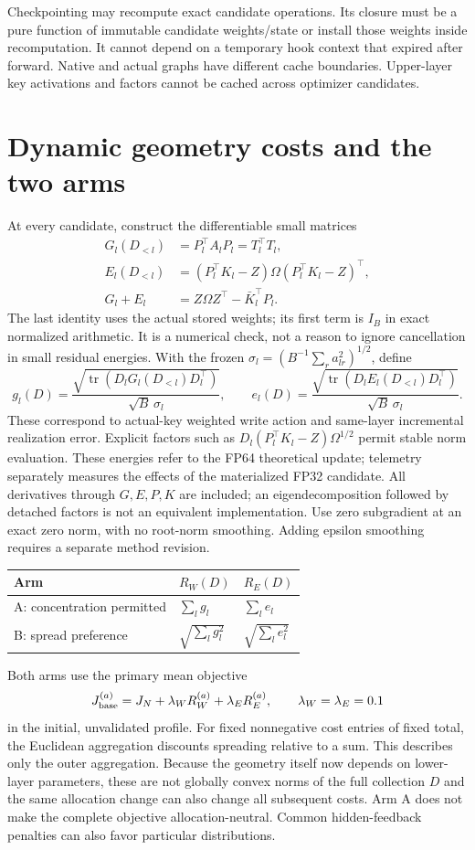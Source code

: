 \documentclass[10pt]{article}
\newcommand{\tr}{\operatorname{tr}}
\begin{document}
Checkpointing may recompute exact candidate operations. Its closure must
be a pure function of immutable candidate weights/state or install those
weights inside recomputation. It cannot depend on a temporary hook
context that expired after forward. Native and actual graphs have
different cache boundaries. Upper-layer key activations and factors
cannot be cached across optimizer candidates.

\newpage
\section{Dynamic geometry costs and the two arms}
At every candidate, construct the differentiable small matrices
\begin{align}
 G_l(D_{<l})&=P_l^\top A_lP_l=T_l^\top T_l,\\
 E_l(D_{<l})&=(P_l^\top K_l-Z)\Omega(P_l^\top K_l-Z)^\top,\\
 G_l+E_l&=Z\Omega Z^\top-\bar K_l^\top P_l.
 \label{eq:grams}
\end{align}
The last identity uses the actual stored weights; its first term is
$I_B$ in exact normalized arithmetic. It is a numerical check, not a
reason to ignore cancellation in small residual energies. With the frozen
$\sigma_l=(B^{-1}\sum_r a_{lr}^2)^{1/2}$, define
\[
 g_l(D)=\frac{\sqrt{\tr(D_lG_l(D_{<l})D_l^\top)}}{\sqrt B\,\sigma_l},
 \qquad
 e_l(D)=\frac{\sqrt{\tr(D_lE_l(D_{<l})D_l^\top)}}{\sqrt B\,\sigma_l}.
\]
These correspond to actual-key weighted write action and same-layer
incremental realization error. Explicit factors such as
$D_l(P_l^\top K_l-Z)\Omega^{1/2}$ permit stable norm evaluation.
These energies refer to the FP64 theoretical update; telemetry separately
measures the effects of the materialized FP32 candidate.
All derivatives through $G,E,P,K$ are included; an eigendecomposition
followed by detached factors is not an equivalent implementation.
Use zero subgradient at an exact zero norm, with no root-norm smoothing.
Adding epsilon smoothing requires a separate method revision.

\begin{center}
\begin{tabular}{lll}
\toprule
Arm & $R_W(D)$ & $R_E(D)$\\
\midrule
A: concentration permitted & $\sum_lg_l$ & $\sum_le_l$\\
B: spread preference & $\sqrt{\sum_lg_l^2}$ & $\sqrt{\sum_le_l^2}$\\
\bottomrule
\end{tabular}
\end{center}
Both arms use the primary mean objective
\[
 J_{\rm base}^{(a)}=J_N+\lambda_WR_W^{(a)}+\lambda_ER_E^{(a)},
 \qquad \lambda_W=\lambda_E=0.1
\]
in the initial, unvalidated profile. For fixed nonnegative cost entries
of fixed total, the Euclidean aggregation discounts spreading relative
to a sum. This describes only the outer aggregation. Because the
geometry itself now depends on lower-layer parameters, these are not
globally convex norms of the full collection $D$ and the same allocation
change can also change all subsequent costs. Arm A does not make the
complete objective allocation-neutral. Common hidden-feedback penalties
can also favor particular distributions.
\end{document}
